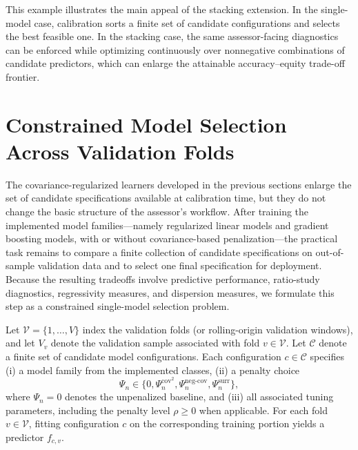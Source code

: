 \documentclass[12pt, draft]{article}
\theoremstyle{plain}
\theoremstyle{definition}
\newcommand{\1}{\mathbf{1}}
\begin{document}
This example illustrates the main appeal of the stacking extension. In the single-model case, calibration sorts a finite set of candidate configurations and selects the best feasible one. In the stacking case, the same assessor-facing diagnostics can be enforced while optimizing continuously over nonnegative combinations of candidate predictors, which can enlarge the attainable accuracy--equity trade-off frontier.




\section{Constrained Model Selection Across Validation Folds}
\label{sec:model_selection}

The covariance-regularized learners developed in the previous sections enlarge the set of candidate specifications available at calibration time, but they do not change the basic structure of the assessor's workflow. After training the implemented model families---namely regularized linear models and gradient boosting models, with or without covariance-based penalization---the practical task remains to compare a finite collection of candidate specifications on out-of-sample validation data and to select one final specification for deployment. Because the resulting tradeoffs involve predictive performance, ratio-study diagnostics, regressivity measures, and dispersion measures, we formulate this step as a constrained single-model selection problem.

Let $\mathcal V=\{1,\dots,V\}$ index the validation folds (or rolling-origin validation windows), and let $V_v$ denote the validation sample associated with fold $v\in\mathcal V$. Let $\mathcal C$ denote a finite set of candidate model configurations. Each configuration $c\in\mathcal C$ specifies
(i) a model family from the implemented classes,
(ii) a penalty choice
\[
\Psi_n \in \{0,\Psi_n^{\mathrm{cov}^2},\Psi_n^{\mathrm{neg\mbox{-}cov}},\Psi_n^{\mathrm{surr}}\},
\]
where $\Psi_n=0$ denotes the unpenalized baseline, and
(iii) all associated tuning parameters, including the penalty level $\rho\ge 0$ when applicable.
For each fold $v\in\mathcal V$, fitting configuration $c$ on the corresponding training portion yields a predictor $f_{c,v}$.
\end{document}
